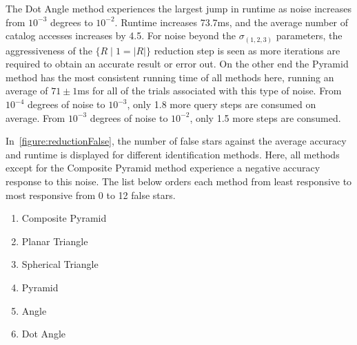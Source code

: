 The Dot Angle method experiences the largest jump in runtime as noise increases from $10^{-3}$ degrees to $10^{-2}$.
Runtime increases 73.7ms, and the average number of catalog accesses increases by 4.5.
For noise beyond the $\sigma_{(1, 2, 3)}$ parameters, the aggressiveness of the $\{ R \mid 1 = |R| \}$ reduction step
is seen as more iterations are required to obtain an accurate result or error out.
On the other end the Pyramid method has the most consistent running time of all methods here, running an average of
$71 \pm 1$ms for all of the trials associated with this type of noise.
From $10^{-4}$ degrees of noise to $10^{-3}$, only 1.8 more query steps are consumed on average.
From $10^{-3}$ degrees of noise to $10^{-2}$, only 1.5 more steps are consumed.

\begin{figure}
\end{figure}

In~\autoref{figure:reductionFalse}, the number of false stars against the average accuracy and runtime is displayed
for different identification methods.
Here, all methods except for the Composite Pyramid method experience a negative accuracy response to this noise.
The list below orders each method from least responsive to most responsive from 0 to 12 false stars.
\begin{multicols}{2}
    \begin{enumerate}
        \item Composite Pyramid
        \item Planar Triangle
        \item Spherical Triangle
        \item Pyramid
        \item Angle
        \item Dot Angle
    \end{enumerate}
\end{multicols}

